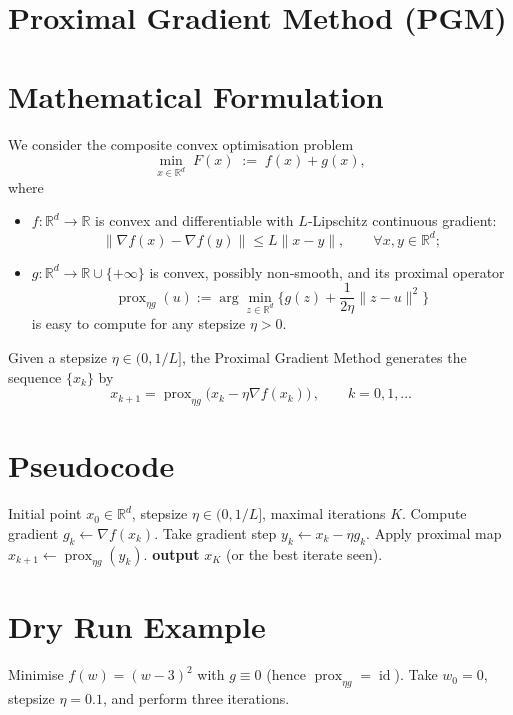 \documentclass{article}
\newcommand{\prox}{\operatorname{prox}}
\newcommand{\R}{\mathbb{R}}
\begin{document}
\section*{Proximal Gradient Method (PGM)}

\section*{Mathematical Formulation}
We consider the composite convex optimisation problem  
\[
\min_{x\in\R^{d}}\; F(x)\;:=\;f(x)+g(x),
\]
where  

\begin{itemize}[noitemsep]
\item $f:\R^{d}\to\R$ is convex and differentiable with $L$‑Lipschitz continuous gradient:
\[
\|\nabla f(x)-\nabla f(y)\|\le L\|x-y\|,\qquad\forall x,y\in\R^{d};
\]
\item $g:\R^{d}\to\R\cup\{+\infty\}$ is convex, possibly non‑smooth, and its proximal operator
\[
\prox_{\eta g}(u):=\arg\min_{z\in\R^{d}}\Big\{ g(z)+\frac{1}{2\eta}\|z-u\|^{2}\Big\}
\]
is easy to compute for any stepsize $\eta>0$.
\end{itemize}

Given a stepsize $\eta\in(0,1/L]$, the Proximal Gradient Method generates the sequence $\{x_k\}$ by  
\[
\boxed{\,x_{k+1}= \prox_{\eta g}\bigl(x_k-\eta\nabla f(x_k)\bigr)\,},\qquad k=0,1,\dots
\tag{1}
\]

\section*{Pseudocode}
\begin{algorithm}[H]
\caption{Proximal Gradient Method}
\begin{algorithmic}[1]
\Require Initial point $x_0\in\R^{d}$, stepsize $\eta\in(0,1/L]$, maximal iterations $K$.
    \State Compute gradient $g_k\gets \nabla f(x_k)$.
    \State Take gradient step $y_k\gets x_k-\eta g_k$.
    \State Apply proximal map $x_{k+1}\gets \prox_{\eta g}(y_k)$.
\EndFor
\State \textbf{output} $x_K$ (or the best iterate seen).
\end{algorithmic}
\end{algorithm}

\section*{Dry Run Example}
Minimise $f(w)=(w-3)^2$ with $g\equiv0$ (hence $\prox_{\eta g}= \operatorname{id}$).  
Take $w_0=0$, stepsize $\eta=0.1$, and perform three iterations.
\end{document}
